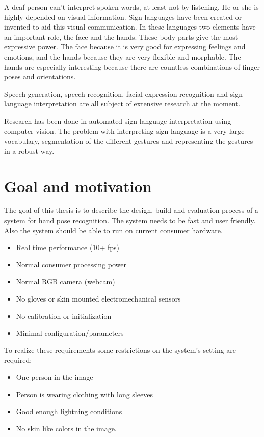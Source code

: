 A deaf person can't interpret spoken words, at least not by listening. He or she is highly depended on visual information. Sign languages have been created or invented to aid this visual communication. In these languages two elements have an important role, the face and the hands. These body parts give the most expressive power. The face because it is very good for expressing feelings and emotions, and the hands because they are very flexible and morphable. The hands are especially interesting because there are countless combinations of finger poses and orientations. 

Speech generation, speech recognition, facial expression recognition and sign language interpretation are all subject of extensive research at the moment.

Research has been done in automated sign language interpretation using computer vision\cite{Buehler2009}\cite{RichardBowden2004}. The problem with interpreting sign language is a very large vocabulary, segmentation of the different gestures and representing the gestures in a robust way.

\section{Goal and motivation}
\label{sec:goal}
The goal of this thesis is to describe the design, build and evaluation process of a system for hand pose recognition. The system needs to be fast and user friendly. Also the system should be able to run on current consumer hardware.

\begin{itemize}
	\item Real time performance (10+ fps)
	\item Normal consumer processing power
	\item Normal RGB camera (webcam)
	\item No gloves or skin mounted electromechanical sensors
	\item No calibration or initialization
	\item Minimal configuration/parameters
\end{itemize}
	

To realize these requirements some restrictions on the system's setting are required:
\begin{itemize}
	\item One person in the image
	\item Person is wearing clothing with long sleeves
	\item Good enough lightning conditions
	\item No skin like colors in the image.
\end{itemize}

